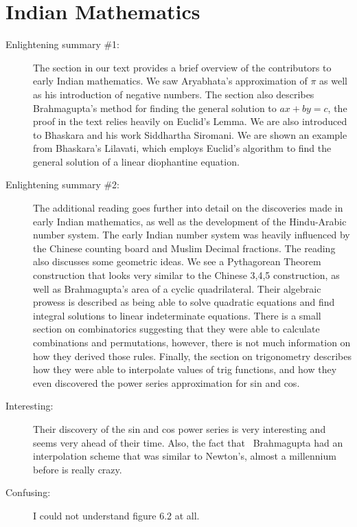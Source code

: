 \documentclass[12pt]{article}
\theoremstyle{homework}
\begin{document}
\section*{Indian Mathematics}

\begin{description}
\item[Enlightening summary \#1:] The section in our text provides a brief overview of the contributors to early Indian mathematics. We saw Aryabhata's approximation of $\pi$ as well as his introduction of negative numbers.  
The section also describes Brahmagupta's method for finding the general solution to $ax + by = c$, the proof in the text relies heavily on Euclid's Lemma. 
We are also introduced to Bhaskara and his work Siddhartha Siromani. We are shown an example from Bhaskara's Lilavati, which employs 
Euclid's algorithm to find the general solution of a linear diophantine equation.   


   
\item[Enlightening summary \#2:]  The additional reading goes further into detail on the discoveries made in early Indian mathematics, as well as the development of the Hindu-Arabic number system. The early Indian number system was heavily influenced by the Chinese counting board and Muslim Decimal fractions. The reading also discusses some geometric ideas. We see 
a Pythagorean Theorem construction that looks very similar to the Chinese 3,4,5 construction, as well as Brahmagupta's area of a cyclic quadrilateral. Their algebraic prowess is described as being able to solve quadratic equations and find integral solutions to linear indeterminate equations. There is a small section on combinatorics suggesting that they were able to calculate combinations and permutations, however, there is not much information on how they derived those rules. Finally, the section on trigonometry describes how they were able to interpolate values of trig functions, and how they even discovered the power series approximation for sin and cos. 




\item[Interesting:]  Their discovery of the sin and cos power series is very interesting and seems very ahead of their time. Also, the fact that \                                                                                        
Brahmagupta had an interpolation scheme that was similar to Newton's, almost a millennium before is really crazy. 

 

\item[Confusing:] I could not understand figure 6.2 at all. 


 
\end{description}
\end{document}
